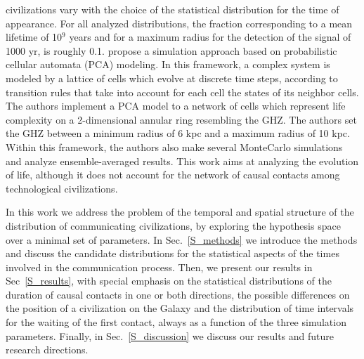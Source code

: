 civilizations vary with the choice of the statistical distribution for
the time of appearance. For all analyzed distributions, the fraction
corresponding to a mean lifetime of 10$^9$ years and for a maximum
radius for the detection of the signal of 1000 yr, is roughly 0.1.
%
\citet{vukotic_astrobiological_2012} propose a simulation approach
based on probabilistic cellular automata (PCA) modeling. In this
framework, a complex system is modeled by a lattice of cells which
evolve at discrete time steps, according to transition rules that take
into account for each cell the states of its neighbor cells.
%
The authors implement a PCA model to a network of cells which
represent life complexity on a 2-dimensional annular ring resembling
the GHZ. The authors set the GHZ between a minimum radius of 6 kpc and
a maximum radius of 10 kpc. Within this framework, the authors also
make several MonteCarlo simulations and analyze ensemble-averaged
results.
%
This work aims at analyzing the evolution of life, although it does
not account for the network of causal contacts among technological
civilizations.


In this work we address the problem of the temporal and spatial
structure of the distribution of communicating civilizations, by
exploring the hypothesis space over a minimal set of parameters.
%
In Sec.~\ref{S_methods} we introduce the methods and discuss the
candidate distributions for the statistical aspects of the times
involved in the communication process.
%
Then, we present our results in Sec~\ref{S_results}, with special
emphasis on the statistical distributions of the duration of causal
contacts in one or both directions, the possible differences on the
position of a civilization on the Galaxy and the distribution of time
intervals for the waiting of the first contact, always as a function
of the three simulation parameters.
%
Finally, in Sec.~\ref{S_discussion} we discuss our results and future
research directions.




